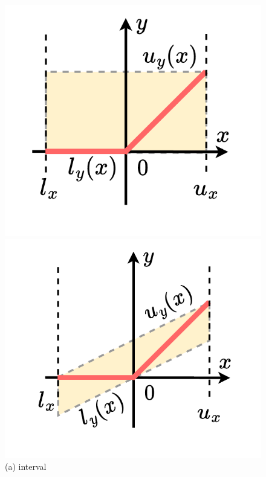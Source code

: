\documentclass[oneside,11pt,dvipsnames]{book}
\numberwithin{equation}{section}
\theoremstyle{definition}
\theoremstyle{remark}
\begin{document}
\begin{figure}
    \begin{minipage}[b]{1\linewidth}
        \centering
        \begin{minipage}[c]{0.24\linewidth}
            \includegraphics[width=\linewidth]{figure/interval-3.pdf}
            \vspace*{-10mm}
            \caption*{(a) interval}
        \end{minipage}
        \begin{minipage}[c]{0.24\linewidth}
            \includegraphics[width=\linewidth]{figure/zonotope-3.pdf}

\end{minipage}
\end{minipage}
\end{figure}
\end{document}
